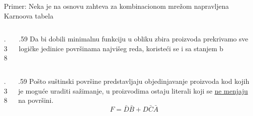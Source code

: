 \begin{frame}[label=02-s043]
\gusttekst
Primer: Neka je na osnovu zahteva za kombinacionom mrežom napravljena Karnoova tabela

\begin{columns}[c,onlytextwidth]
\begin{column}{.38\textwidth}\centering

\end{column}
\begin{column}{.59\textwidth}\gusttekst
Da bi dobili minimalnu funkciju u obliku zbira proizvoda prekrivamo sve logičke jedinice površinama najvišeg reda, koristeći se i sa stanjem b
\end{column}
\end{columns}
\begin{columns}[c,onlytextwidth]
\begin{column}{.38\textwidth}\centering

\end{column}
\begin{column}{.59\textwidth}\gusttekst
Pošto suštinski površine predstavljaju objedinjavanje proizvoda kod kojih je moguće uraditi sažimanje, u proizvodima ostaju literali koji se \alert{\underline{ne menjaju}} na površini.
\[
F=\bar{D}\bar{B}+D\bar{C}\bar{A}
\]
\end{column}
\end{columns}
\end{frame}
